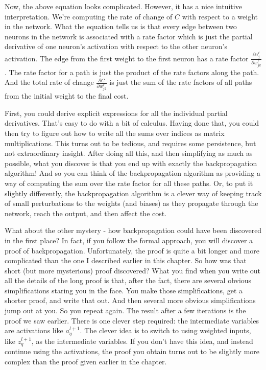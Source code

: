 \documentclass[12pt, letterpaper]{article}
\theoremstyle{definition}
\begin{document}
Now, the above equation looks complicated. However, it has a nice intuitive interpretation. We're computing the rate of change of $C$ with respect to a weight in the network. What the equation tells us is that every edge between two neurons in the network is associated with a rate factor which is just the partial derivative of one neuron's activation with respect to the other neuron's activation. The edge from the first weight to the first neuron has a rate factor $\frac{\partial a^\ell_j}{\partial w^\ell_{jk}}$. The rate factor for a path is just the product of the rate factors along the path. And the total rate of change $\frac{\partial C}{\partial w^\ell_{jk}}$ is just the sum of the rate factors of all paths from the initial weight to the final cost.

First, you could derive explicit expressions for all the individual partial derivatives. That's easy to do with a bit of calculus. Having done that, you could then try to figure out how to write all the sums over indices as matrix multiplications. This turns out to be tedious, and requires some persistence, but not extraordinary insight. After doing all this, and then simplifying as much as possible, what you discover is that you end up with exactly the backpropagation algorithm! And so you can think of the backpropagation algorithm as providing a way of computing the sum over the rate factor for all these paths. Or, to put it slightly differently, the backpropagation algorithm is a clever way of keeping track of small perturbations to the weights (and biases) as they propagate through the network, reach the output, and then affect the cost.

What about the other mystery - how backpropagation could have been discovered in the first place? In fact, if you follow the formal approach, you will discover a proof of backpropagation. Unfortunately, the proof is quite a bit longer and more complicated than the one I described earlier in this chapter. So how was that short (but more mysterious) proof discovered? What you find when you write out all the details of the long proof is that, after the fact, there are several obvious simplifications staring you in the face. You make those simplifications, get a shorter proof, and write that out. And then several more obvious simplifications jump out at you. So you repeat again. The result after a few iterations is the proof we saw earlier. There is one clever step required: the intermediate variables are activations like $a^{l+1}_q$. The clever idea is to switch to using weighted inputs, like $z^{l+1}_q$, as the intermediate variables. If you don't have this idea, and instead continue using the activations, the proof you obtain turns out to be slightly more complex than the proof given earlier in the chapter.
\end{document}
